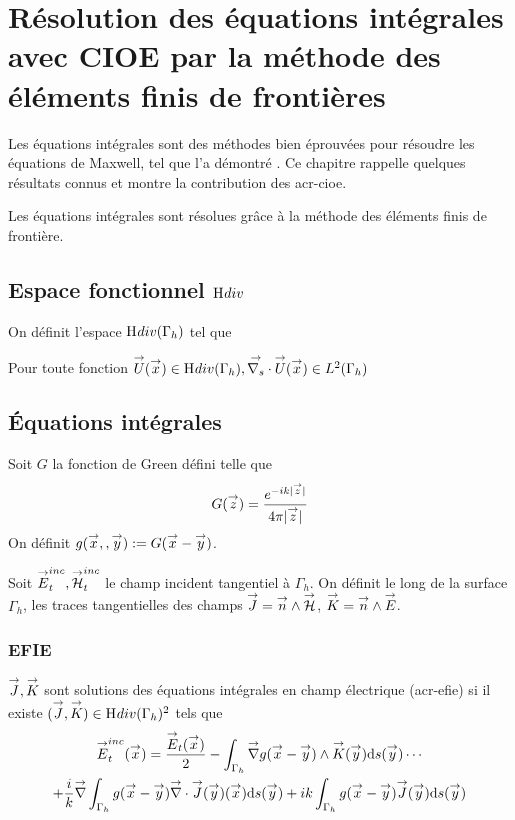 \section{Résolution des équations intégrales avec CIOE par la méthode des éléments finis de frontières}

  \newcommand{\phij}{\vect{\phi_j}}

  Les équations intégrales sont des méthodes bien éprouvées pour résoudre les équations de Maxwell, tel que l'a démontré \cite{nedelec_acoustic_2001}. Ce chapitre rappelle quelques résultats connus et montre la contribution des \gls{acr-cioe}.

  Les équations intégrales sont résolues grâce à la méthode des éléments finis de frontière.

  \subsection[Espace fonctionnel Hdiv]{Espace fonctionnel \(\mathrm{H}_\mathrm{{}}{div}\)}
    On définit l'espace \(\mathrm{H}_\mathrm{{}}{div}(\Gamma_h)\) tel que
    \begin{defn}
      Pour toute fonction \({\overset{\rightarrow}{U}}({\overset{\rightarrow}{x}}) \in \mathrm{H}_\mathrm{{}}{div}(\Gamma_h), {\overset{\rightarrow}{\nabla_s}} \cdot{\overset{\rightarrow}{U}}({\overset{\rightarrow}{x}}) \in L^2(\Gamma_h)\)
    \end{defn}

  \subsection{Équations intégrales}

      Soit \(G\) la fonction de Green défini telle que
      \begin{equation}
        G({\overset{\rightarrow}{z}}) = \dfrac{e^{-ik|{\overset{\rightarrow}{z}}|}}{4\pi|{\overset{\rightarrow}{z}}|}
      \end{equation}
      On définit \(g({\overset{\rightarrow}{x}},,{\overset{\rightarrow}{y}}) := G({\overset{\rightarrow}{x}} - {\overset{\rightarrow}{y}})\).

      Soit \({\overset{\rightarrow}{E}}^{inc}_t,{\overset{\rightarrow}{\mathcal{H}}}^{inc}_t\) le champ incident tangentiel à \(\Gamma_h\). On définit le long de la surface \(\Gamma_h\), les traces tangentielles des champs \({\overset{\rightarrow}{J}} = {\overset{\rightarrow}{n}} \wedge {\overset{\rightarrow}{\mathcal{H}}}\), \({\overset{\rightarrow}{K}} = {\overset{\rightarrow}{n}} \wedge {\overset{\rightarrow}{E}}\).

      \subsubsection{EFIE}

        \begin{defn}
          \({\overset{\rightarrow}{J}},{\overset{\rightarrow}{K}}\) sont solutions des équations intégrales en champ électrique (\gls{acr-efie}) si il existe \(({\overset{\rightarrow}{J}},{\overset{\rightarrow}{K}}) \in \mathrm{H}_\mathrm{{}}{div}(\Gamma_h)^2\) tels que
          \begin{multline}
            \label{eq:form_int:EFIE}
            \vE^{inc}_t(\vx) =
              \frac{\vE_t(\vx)}{2}
                - \int_{\Gamma_h} \vgrad g(\vx - \vy) \pvect \vK(\vy) \dd{s}(\vy) \cdots \\
              + \frac{i}{k}\vgrad \int_{\Gamma_h}  g(\vx - \vy)\vdiv\vJ(\vy)(\vx) \dd{s}(\vy)
                +  ik\int_{\Gamma_h} g(\vx - \vy)\vJ(\vy) \dd{s}(\vy)
          \end{multline}
        \end{defn}

